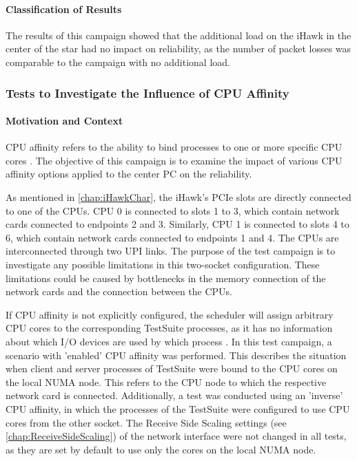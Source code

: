\paragraph{Classification of Results}
The results of this campaign showed that the additional load on the iHawk in the center of the star had no impact on reliability, as the number of packet losses was comparable to the campaign with no additional load.


\subsubsection{Tests to Investigate the Influence of CPU Affinity}
\paragraph{Motivation and Context}

CPU affinity refers to the ability to bind processes to one or more specific CPU cores \cite{reli06}. The objective of this campaign is to examine the impact of various CPU affinity options applied to the center PC on the reliability.

As mentioned in \ref{chap:iHawkChar}, the iHawk's PCIe slots are directly connected to one of the CPUs. CPU 0 is connected to slots 1 to 3, which contain network cards connected to endpoints 2 and 3. Similarly, CPU 1 is connected to slots 4 to 6, which contain network cards connected to endpoints 1 and 4. The CPUs are interconnected through two UPI links. The purpose of the test campaign is to investigate any possible limitations in this two-socket configuration. These limitations could be caused by bottlenecks in the memory connection of the network cards and the connection between the CPUs.

If CPU affinity is not explicitly configured, the scheduler will assign arbitrary CPU cores to the corresponding TestSuite processes, as it has no information about which I/O devices are used by which process \cite{reli07}. In this test campaign, a scenario with 'enabled' CPU affinity was performed. This describes the situation when client and server processes of TestSuite were bound to the CPU cores on the local NUMA node. This refers to the CPU node to which the respective network card is connected. Additionally, a test was conducted using an 'inverse' CPU affinity, in which the processes of the TestSuite were configured to use CPU cores from the other socket. The Receive Side Scaling settings (see \ref{chap:ReceiveSideScaling}) of the network interface were not changed in all tests, as they are set by default to use only the cores on the local NUMA node.

